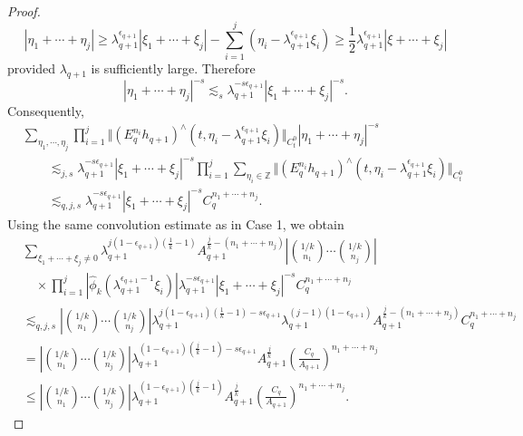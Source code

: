 \documentclass[12pt,reqno,letterpaper]{amsart}
\numberwithin{equation}{section}
\newcommand{\1}{{\bf 1}}
\newcommand{\2}{{\bf 2}}
\newcommand{\Z}{\mathbb Z}
\theoremstyle{remark}
\theoremstyle{remark}
\begin{document}
\begin{proof}
\begin{equation}\label{eq:page29_est}
|\eta_1 +\cdots +\eta_j| \ge \lambda_{q+1}^{\epsilon_{q+1}}|\xi_1+ \cdots +\xi_j| - \sum_{i=1}^j \left(\eta_i-\lambda_{q+1}^{\epsilon_{q+1}}\xi_i\right) \ge \frac12 \lambda_{q+1}^{\epsilon_{q+1}}|\xi+\cdots+\xi_j|
\end{equation}
provided $\lambda_{q+1}$ is sufficiently large. Therefore
\[
|\eta_1 +\cdots +\eta_j|^{-s} \lesssim_s \lambda_{q+1}^{-s\epsilon_{q+1}}|\xi_1 + \cdots +\xi_j|^{-s}.
\]
Consequently,
\[
\begin{aligned}
    &\sum_{\eta_1,\cdots,\eta_j}\prod_{i=1}^j \Vert(E_q^{n_i}h_{q+1})^\wedge(t,\eta_i - \lambda_{q+1}^{\epsilon_{q+1}}\xi_i)\Vert_{C_t^0} |\eta_1 + \cdots + \eta_j|^{-s}\\
    &\qquad \lesssim_{j,s} \lambda_{q+1}^{-s\epsilon_{q+1}}|\xi_1 + \cdots + \xi_j|^{-s} \prod_{i=1}^j \sum_{\eta_i \in \Z} \Vert (E^{n_i}_q h_{q+1})^\wedge (t,\eta_i - \lambda_{q+1}^{\epsilon_{q+1}}\xi_i)\Vert_{C_t^0}\\
    &\qquad \lesssim_{q,j,s} \lambda_{q+1}^{-s\epsilon_{q+1}}|\xi_1 + \cdots + \xi_j|^{-s} C^{n_1+\cdots+n_j}_q.
\end{aligned}
\]
Using the same convolution estimate as in Case 1, we obtain
\begin{equation}\label{eq:page_29_est_3}
    \begin{split}
        &\sum_{\xi_1+\cdots+\xi_j\neq0}
\lambda_{q+1}^{j(1-\epsilon_{q+1})(\frac1k-1)}
A_{q+1}^{\frac jk-(n_1+\cdots+n_j)}
\left|\binom{1/k}{n_1}\cdots\binom{1/k}{n_j}\right|
\\
&\quad\times
\prod_{i=1}^j
\left|
\hat{\phi}_k
\left(\lambda_{q+1}^{\epsilon_{q+1}-1}\xi_i\right)
\right|
\lambda_{q+1}^{-s\epsilon_{q+1}}
|\xi_1+\cdots+\xi_j|^{-s}
C_q^{n_1+\cdots+n_j}
\\
&\lesssim_{q,j,s}
\left|\binom{1/k}{n_1}\cdots\binom{1/k}{n_j}\right|
\lambda_{q+1}^{j(1-\epsilon_{q+1})(\frac1k-1)-s\epsilon_{q+1}}
\lambda_{q+1}^{(j-1)(1-\epsilon_{q+1})}
A_{q+1}^{\frac jk-(n_1+\cdots+n_j)}
C_q^{n_1+\cdots+n_j}
\\
&=
\left|\binom{1/k}{n_1}\cdots\binom{1/k}{n_j}\right|
\lambda_{q+1}^{(1-\epsilon_{q+1})(\frac jk-1)-s\epsilon_{q+1}}
A_{q+1}^{\frac jk}
\left(\frac{C_q}{A_{q+1}}\right)^{n_1+\cdots+n_j}
\\
&\leq
\left|\binom{1/k}{n_1}\cdots\binom{1/k}{n_j}\right|
\lambda_{q+1}^{(1-\epsilon_{q+1})(\frac jk-1)}
A_{q+1}^{\frac jk}
\left(\frac{C_q}{A_{q+1}}\right)^{n_1+\cdots+n_j}.
    \end{split}
\end{equation}


\end{proof}
\end{document}
